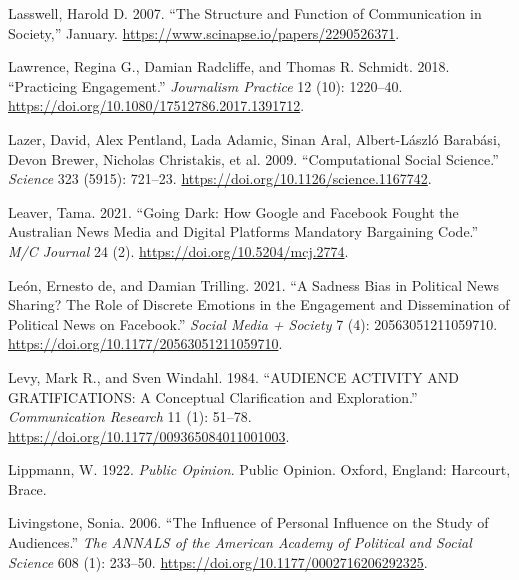 \documentclass[
]{article}
\newlength{\cslhangindent}
\newlength{\cslentryspacingunit} %
\newenvironment{CSLReferences}[2] %
 {%
  \setlength{\parindent}{0pt}
  \ifodd #1
  \let\oldpar\par
  \def\par{\hangindent=\cslhangindent\oldpar}
  \fi
  \setlength{\parskip}{#2\cslentryspacingunit}
 }%
 {}
\begin{document}
\begin{CSLReferences}{1}{0}
\leavevmode{}%
Lasswell, Harold D. 2007. {``The Structure and Function of Communication
in Society,''} January. \url{https://www.scinapse.io/papers/2290526371}.

\leavevmode{}%
Lawrence, Regina G., Damian Radcliffe, and Thomas R. Schmidt. 2018.
{``Practicing {Engagement}.''} \emph{Journalism Practice} 12 (10):
1220--40. \url{https://doi.org/10.1080/17512786.2017.1391712}.

\leavevmode{}%
Lazer, David, Alex Pentland, Lada Adamic, Sinan Aral, Albert-László
Barabási, Devon Brewer, Nicholas Christakis, et al. 2009.
{``Computational {Social} {Science}.''} \emph{Science} 323 (5915):
721--23. \url{https://doi.org/10.1126/science.1167742}.

\leavevmode{}%
Leaver, Tama. 2021. {``Going {Dark}: {How} {Google} and {Facebook}
{Fought} the {Australian} {News} {Media} and {Digital} {Platforms}
{Mandatory} {Bargaining} {Code}.''} \emph{M/C Journal} 24 (2).
\url{https://doi.org/10.5204/mcj.2774}.

\leavevmode{}%
León, Ernesto de, and Damian Trilling. 2021. {``A {Sadness} {Bias} in
{Political} {News} {Sharing}? {The} {Role} of {Discrete} {Emotions} in
the {Engagement} and {Dissemination} of {Political} {News} on
{Facebook}.''} \emph{Social Media + Society} 7 (4): 20563051211059710.
\url{https://doi.org/10.1177/20563051211059710}.

\leavevmode{}%
Levy, Mark R., and Sven Windahl. 1984. {``{AUDIENCE} {ACTIVITY} {AND}
{GRATIFICATIONS}: {A} {Conceptual} {Clarification} and {Exploration}.''}
\emph{Communication Research} 11 (1): 51--78.
\url{https://doi.org/10.1177/009365084011001003}.

\leavevmode{}%
Lippmann, W. 1922. \emph{Public Opinion}. Public Opinion. Oxford,
England: Harcourt, Brace.

\leavevmode{}%
Livingstone, Sonia. 2006. {``The {Influence} of {Personal} {Influence}
on the {Study} of {Audiences}.''} \emph{The ANNALS of the American
Academy of Political and Social Science} 608 (1): 233--50.
\url{https://doi.org/10.1177/0002716206292325}.


\end{CSLReferences}
\end{document}
